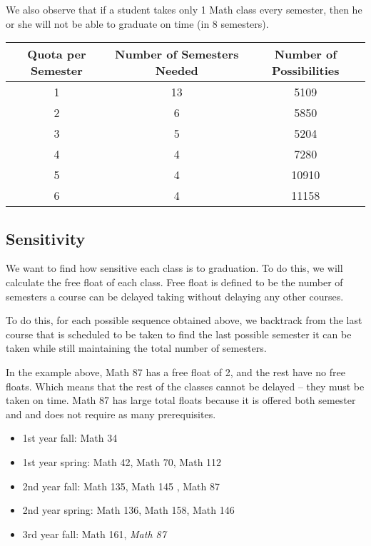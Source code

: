 \documentclass[11pt, oneside]{article}
\begin{document}
We also observe that if a student takes only 1 Math class every semester, then he or she will not be able to graduate on time (in 8 semesters).

\begin{center}
    \begin{tabular}{c | c | c}
        \toprule
        Quota per Semester & Number of Semesters Needed & Number of Possibilities \\
        \midrule
        1 & 13 &5109 \\
        2 & 6 & 5850 \\ 
        3 & 5 & 5204 \\
        4 & 4 & 7280 \\
        5 & 4 & 10910 \\
        6 & 4 & 11158 \\
        \bottomrule
    \end{tabular}
\end{center}

\subsection{Sensitivity}
We want to find how sensitive each class is to graduation. To do this, we will calculate the free float of each class. Free float is defined to be the number of semesters a course can be delayed taking without delaying any other courses. 

To do this, for each possible sequence obtained above, we backtrack from the last course that is scheduled to be taken to find the last possible semester it can be taken while still maintaining the total number of semesters. 

In the example above, Math 87 has a free float of 2, and the rest have no free floats. Which means that the rest of the classes cannot be delayed -- they must be taken on time. Math 87 has large total floats because it is offered both semester and and does not require as many prerequisites. 

\begin{itemize}
    \item 1st year fall: Math 34
    \item 1st year spring: Math 42, Math 70, Math 112
    \item 2nd year fall: Math 135, Math 145 \color{gray}, Math 87 \color{black}
    \item 2nd year spring: Math 136, Math 158, Math 146
    \item 3rd year fall: Math 161, \textit{Math 87}
    \end{itemize}
\end{document}
